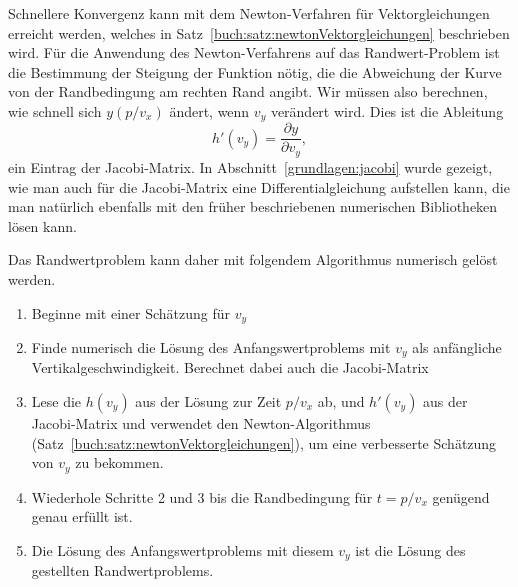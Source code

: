 Schnellere Konvergenz kann mit dem Newton-Verfahren für Vektorgleichungen
erreicht werden,
welches in Satz~\ref{buch:satz:newtonVektorgleichungen}
beschrieben wird.
%
Für die Anwendung des Newton-Verfahrens auf das Randwert-Problem
ist die Bestimmung der Steigung der Funktion nötig, die die Abweichung
der Kurve von der Randbedingung am rechten Rand angibt.
Wir müssen also berechnen, wie schnell sich $y(p/v_x)$ ändert,
wenn $v_y$ verändert wird.
Dies ist die Ableitung
\[
h'(v_y)= \frac{\partial y}{\partial v_y},
\]
ein Eintrag der Jacobi-Matrix.
In Abschnitt~\ref{grundlagen:jacobi} wurde gezeigt, wie man auch für
die Jacobi-Matrix eine Differentialgleichung aufstellen kann, die
man natürlich ebenfalls mit den früher beschriebenen numerischen
Bibliotheken lösen kann.

Das Randwertproblem kann daher mit folgendem Algorithmus numerisch gelöst
werden.
\begin{enumerate}
\item Beginne mit einer Schätzung für $v_y$
\item Finde numerisch die Lösung des Anfangswertproblems mit $v_y$
als anfängliche Vertikalgeschwindigkeit.
Berechnet dabei auch die Jacobi-Matrix
\item Lese die $h(v_y)$ aus der Lösung zur Zeit $p/v_x$ ab, und $h'(v_y)$
aus der Jacobi-Matrix und verwendet den Newton-Algorithmus
(Satz~\ref{buch:satz:newtonVektorgleichungen}), um eine verbesserte
Schätzung von $v_y$ zu bekommen.
\item Wiederhole Schritte 2 und 3 bis die Randbedingung für $t=p/v_x$
genügend genau erfüllt ist.
\item Die Lösung des Anfangswertproblems mit diesem $v_y$ ist die
Lösung des gestellten Randwertproblems.
\end{enumerate}

